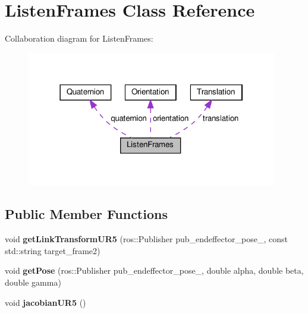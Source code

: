 \hypertarget{classListenFrames}{}\section{Listen\+Frames Class Reference}
\label{classListenFrames}


Collaboration diagram for Listen\+Frames\+:
\nopagebreak
\begin{figure}[H]
\begin{center}
\leavevmode
\includegraphics[width=310pt]{d2/d57/classListenFrames__coll__graph}
\end{center}
\end{figure}
\subsection*{Public Member Functions}
\begin{DoxyCompactItemize}
\item 
\mbox{\label{classListenFrames_a33dac0513c91658e7cbbe85c0c0647cf}} 
void {\bfseries get\+Link\+Transform\+U\+R5} (ros\+::\+Publisher pub\+\_\+endeffector\+\_\+pose\+\_\+, const std\+::string target\+\_\+frame2)
\item 
\mbox{\label{classListenFrames_af6e97a970ca702f7637624e4b463a56f}} 
void {\bfseries get\+Pose} (ros\+::\+Publisher pub\+\_\+endeffector\+\_\+pose\+\_\+, double alpha, double beta, double gamma)
\item 
\mbox{\label{classListenFrames_a9ba6e284adaf8241314af141a5365fff}} 
void {\bfseries jacobian\+U\+R5} ()
\end{DoxyCompactItemize}
